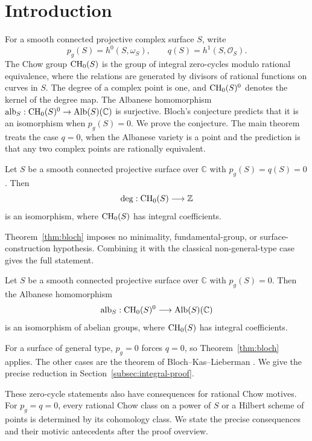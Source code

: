 \section{Introduction}\label{sec:introduction}

For a smooth connected projective complex surface \(S\), write
\[
p_g(S)=h^0(S,\omega_S),\qquad q(S)=h^1(S,\mathcal O_S).
\]
The Chow group $\operatorname{CH}_0(S)$ is the group of integral zero-cycles modulo
rational equivalence, where the relations are generated by divisors
of rational functions on curves in $S$.  The degree of a complex point is one, and
$\operatorname{CH}_0(S)^0$ denotes the kernel of the degree map.
The Albanese homomorphism
\(\operatorname{alb}_S:\operatorname{CH}_0(S)^0\to\operatorname{Alb}(S)(\mathbb C)\) is
surjective. Bloch's conjecture predicts that it is an isomorphism when
\(p_g(S)=0\). We prove the conjecture. The main theorem treats the
case \(q=0\), when the Albanese variety is a point and the prediction
is that any two complex points are rationally equivalent.

\begin{theorem}\label{thm:bloch}
Let \(S\) be a smooth connected projective surface over \(\mathbb C\)
with \(p_g(S)=q(S)=0\). Then
\[
\deg:\operatorname{CH}_0(S)\longrightarrow\mathbb Z
\]
is an isomorphism, where \(\operatorname{CH}_0(S)\) has integral coefficients.
\end{theorem}

Theorem~\ref{thm:bloch} imposes no minimality, fundamental-group, or
surface-construction hypothesis. Combining it with the classical
non-general-type case gives the full statement.

\begin{corollary}[Bloch's conjecture for surfaces with \(p_g=0\)]\label{cor:bloch-pg-zero}
Let \(S\) be a smooth connected projective surface over \(\mathbb C\)
with \(p_g(S)=0\). Then the Albanese homomorphism
\[
\operatorname{alb}_S:\operatorname{CH}_0(S)^0\longrightarrow\operatorname{Alb}(S)(\mathbb C)
\]
is an isomorphism of abelian groups, where \(\operatorname{CH}_0(S)\) has integral
coefficients.
\end{corollary}

For a surface of general type, $p_g=0$ forces $q=0$, so
Theorem~\ref{thm:bloch} applies. The other cases are the theorem of
Bloch--Kas--Lieberman \cite{BKL}. We give the precise reduction in
Section~\ref{subsec:integral-proof}.


These zero-cycle statements also have consequences for rational Chow
motives. For $p_g=q=0$, every rational Chow class on a power of $S$
or a Hilbert scheme of points is determined by its cohomology class.
We state the precise consequences and their motivic antecedents after
the proof overview.


